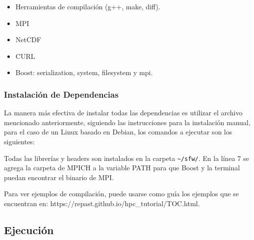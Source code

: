 \begin{itemize}
	
	\item
	Herramientas de compilación (g++, make, diff).
	\item
	MPI
	\item
	NetCDF
	\item
	CURL
	\item
	Boost: serialization, system, filesystem y mpi.
\end{itemize}

\subsubsection{Instalación de Dependencias}

La manera más efectiva de instalar todas las dependencias es utilizar el
archivo mencionado anteriormente, siguiendo las instrucciones para la
instalación manual, para el caso de un Linux basado en Debian, los
comandos a ejecutar son los siguientes:

\begin{Shaded}
	\begin{Highlighting}[]
		
		\KeywordTok{\&\&} 
		
		 
	\end{Highlighting}
\end{Shaded}

Todas las librerías y headers son instalados en la carpeta
\texttt{\textasciitilde{}/sfw/}. En la línea 7 se agrega la carpeta de
MPICH a la variable PATH para que Boost y la terminal puedan encontrar
el binario de MPI.

Para ver ejemplos de compilación, puede usarse como guía los ejemplos
que se encuentran en: https://repast.github.io/hpc\_tutorial/TOC.html.

\subsection{Ejecución}

